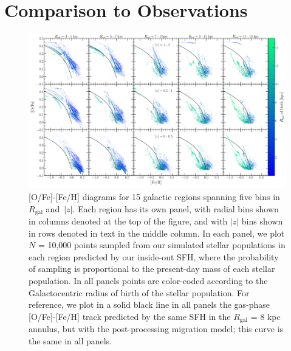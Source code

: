 \documentclass[fleqn, usenatbib]{mnras}
\begin{document}
\section{Comparison to Observations} 
\label{sec:comp_obs} 

\begin{figure} 
\centering 
\includegraphics[scale = 0.28]{ofe_feh_densitymap.pdf} 
\caption{[O/Fe]-[Fe/H] diagrams for 15 galactic regions spanning five bins in 
$R_\text{gal}$ and~$\left|z\right|$. Each region has its own panel, with radial 
bins shown in columns denoted at the top of the figure, and with 
$\left|z\right|$ bins shown in rows denoted in text in the middle column. In 
each panel, we plot $N$ = 10,000 points sampled from our simulated 
stellar populations in each region predicted by our inside-out SFH, where the 
probability of sampling is proportional to the present-day mass of each stellar 
population. In all panels points are color-coded according to the 
Galactocentric radius of birth of the stellar population. For reference, we 
plot in a solid black line in all panels the gas-phase [O/Fe]-[Fe/H] track 
predicted by the same SFH in the $R_\text{gal}$ = 8 kpc annulus, but with the 
post-processing migration model; this curve is the same in all panels. }
\label{fig:ofe_feh_diagram} 
\end{figure} 
\end{document}

